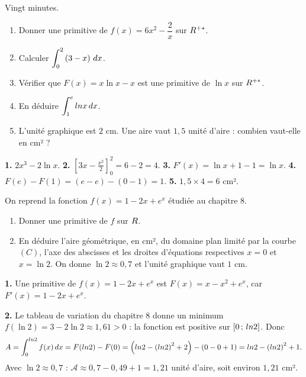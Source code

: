 \begin{jemeteste}
Vingt minutes.

\begin{enumerate}[label=\textbf{\arabic*.}, leftmargin=*, itemsep=0.3em]
  \item Donner une primitive de $f(x) = 6x^{2}-\dfrac2x$ sur $R^{+*}$.
  \item Calculer $\displaystyle\int_{0}^{2}\left(3-x\right)\,dx$.
  \item Vérifier que $F(x) = x\ln x-x$ est une primitive de $\ln x$ sur
        $R^{+*}$.
  \item En déduire $\displaystyle\int_{1}^{e} ln x\,dx$.
  \item L'unité graphique est $2$ cm. Une aire vaut $1{,}5$ unité d'aire :
        combien vaut-elle en cm² ?
\end{enumerate}
\end{jemeteste}

\begin{corrige}[je me teste]
\textbf{1.} $2x^{3}-2\ln x$.
\textbf{2.} $\left[3x-\frac{x^{2}}{2}\right]_{0}^{2} = 6-2 = 4$.
\textbf{3.} $F'(x) = \ln x+1-1 = \ln x$. \checkmark
\textbf{4.} $F(e)-F(1) = (e-e)-(0-1) = 1$.
\textbf{5.} $1{,}5\times4 = 6$ cm².
\end{corrige}

\begin{commeaubac}
On reprend la fonction $f(x) = 1-2x+e^{x}$ étudiée au chapitre 8.

\begin{enumerate}[label=\textbf{\arabic*.}, leftmargin=*, itemsep=0.25em]
  \item Donner une primitive de $f$ sur $R$. \bareme{1 pt}
  \item En déduire l'aire géométrique, en cm², du domaine plan limité par la
        courbe $(C)$, l'axe des abscisses et les droites d'équations
        respectives $x = 0$ et $x = \ln 2$. On donne
        $\ln 2 \approx 0{,}7$ et l'unité graphique vaut $1$ cm.
        \bareme{1 pt}
\end{enumerate}
\end{commeaubac}

\begin{corrige}
\textbf{1.} Une primitive de $f(x) = 1-2x+e^{x}$ est
$F(x) = x-x^{2}+e^{x}$, car $F'(x) = 1-2x+e^{x}$.

\textbf{2.} Le tableau de variation du chapitre 8 donne un minimum
$f(\ln2) = 3-2\ln2 \approx 1{,}61 > 0$ : la fonction est positive sur
$\left[0\,;\,ln2\right]$. Donc
\[
  A = \int_{0}^{ln2} f(x)\,dx = F(ln2)-F(0)
  = \left(ln2-\left(ln2\right)^{2}+2\right)-\left(0-0+1\right)
  = ln2-\left(ln2\right)^{2}+1 .
\]
Avec $\ln2 \approx 0{,}7$ : $\mathcal A \approx 0{,}7-0{,}49+1 = 1{,}21$
unité d'aire, soit environ $1{,}21$ cm².
\end{corrige}

